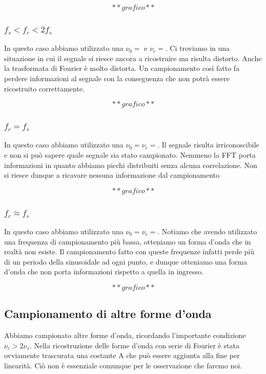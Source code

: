 $$**grafico**$$

\subsubsection{ $f_s<f_c<2f_s$}


In questo caso abbiamo utilizzato una $\nu_0=$ e $\nu_c=$. Ci troviamo in una situazione in cui il segnale si riesce ancora a ricostruire ma risulta distorto. Anche la trasformata di Fourier è molto distorta. Un campionamento così fatto fa perdere informazioni al segnale con la conseguenza che non potrà essere ricostruito correttamente.

$$**grafico**$$

\subsubsection{ $f_c = f_s$}

In questo caso abbiamo utilizzato una $\nu_0=\nu_c=$. Il segnale risulta irriconoscibile e non si può sapere quale segnale sia stato campionato. Nemmeno la FFT porta informazioni in quanto abbiamo picchi distribuiti senza alcuna correlazione. Non si riesce dunque a ricavare nessuna informazione dal campionamento

$$**grafico**$$

\subsubsection{ $f_c \approx f_s$}
In questo caso abbiamo utilizzato una $\nu_0=\nu_c=$. Notiamo che avendo utilizzato una frequenza di campionamento più bassa, otteniamo un forma d'onda che in realtà non esiste. Il campionamento fatto con queste frequenze infatti perde più di un periodo della sinusoidale ad ogni punto, e dunque otteniamo una forma d'onda che non porta informazioni rispetto a quella in ingresso.

$$**grafico**$$

\subsection{Campionamento di altre forme d'onda}
Abbiamo campionato altre forme d'onda, ricordando l'importante condizione $\nu_c>2\nu_s$. Nella ricostruzione delle forme d'onda con serie di Fourier è stata ovviamente trascurata una costante A che può essere aggiunta alla fine per linearità. Ciò non è essenziale comunque per le osservazione che faremo noi.


